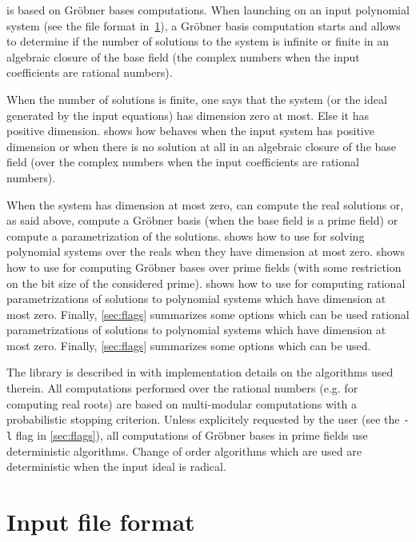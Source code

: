 \documentclass[a4paper,english,11pt]{scrartcl}
\theoremstyle{definition}
\theoremstyle{remark}
\begin{document}
\msolve is based on Gr\"obner bases computations. When launching \msolve on 
an input polynomial system (see the file format in~\cref{sec:input}), a Gr\"obner 
basis computation starts and allows \msolve to determine if the number of solutions 
to the system is infinite or finite in an algebraic closure of the base field 
(the complex numbers when the input coefficients are rational numbers).

When the number of solutions is finite, one says that the system (or the ideal 
generated by the input equations) has dimension zero at most. Else it has positive 
dimension. 
 shows how \msolve behaves when the input system has positive dimension 
or when there is no solution at all in an algebraic closure of the base field (over 
the complex numbers when the input coefficients are rational numbers). 

When the system has dimension at most zero, \msolve can compute the real solutions 
or, as said above, compute a Gr\"obner basis (when the base field is a prime field) 
or compute a parametrization of the solutions. 
 shows how to use \msolve for solving polynomial 
systems over the reals when they have dimension at most zero. 
 shows how to use \msolve for computing 
Gr\"obner bases over prime fields (with some restriction on the bit size of the 
considered prime).  shows how to use \msolve for computing rational 
parametrizations of solutions to polynomial systems which have dimension at most 
zero. Finally, \cref{sec:flags} summarizes some options which can be used rational 
parametrizations of solutions to polynomial systems which have dimension at most 
zero. Finally, \cref{sec:flags} summarizes some options which can be used. 

The \msolve library is described in \cite{msolve} with implementation details on 
the algorithms used therein. All computations performed over the rational numbers 
(e.g. for computing real roots) are based on multi-modular computations with a 
probabilistic stopping criterion. Unless explicitely requested by the user (see the 
\verb+-l+ flag in \cref{sec:flags}), all computations of Gr\"obner bases 
in prime fields use deterministic 
algorithms. Change of order algorithms which are used are deterministic 
when the input ideal is radical.

\section{Input file format}\label{sec:input}
\end{document}
